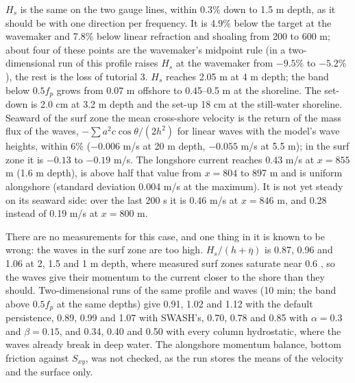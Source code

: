 $H_s$ is the same on the two gauge lines, within 0.3\% down to 1.5 m
depth, as it should be with one direction per frequency. It is 4.9\%
below the target at the wavemaker and 7.8\% below linear refraction and
shoaling from 200 to 600 m; about four of these points are the
wavemaker's midpoint rule (in a two-dimensional run of this profile
 raises $H_s$ at the wavemaker from $-9.5\%$ to
$-5.2\%$), the rest is the loss of tutorial 3. $H_s$ reaches 2.05 m at
4 m depth; the band below $0.5 f_p$ grows from 0.07 m offshore to
0.45--0.5 m at the shoreline. The set-down is 2.0 cm at 3.2 m depth and
the set-up 18 cm at the still-water shoreline. Seaward of the surf zone
the mean cross-shore velocity is the return of the mass flux of the waves,
$-\sum a^2 c\cos\theta/(2h^2)$ for linear waves with the model's wave
heights, within 6\% ($-0.006$ m/s at 20 m depth, $-0.055$ m/s at 5.5 m);
in the surf zone it is $-0.13$ to $-0.19$ m/s. The longshore current
reaches 0.43 m/s at $x = 855$ m (1.6 m depth), is above half that value
from $x = 804$ to 897 m and is uniform alongshore (standard deviation
0.004 m/s at the maximum). It is not yet steady on its seaward side: over
the last 200 s it is 0.46 m/s at $x = 846$ m, and 0.28 instead of
0.19 m/s at $x = 800$ m.

There are no measurements for this case, and one thing in it is known to
be wrong: the waves in the surf zone are too high. $H_s/(h+\bar\eta)$ is
0.87, 0.96 and 1.06 at 2, 1.5 and 1 m depth, where measured surf zones
saturate near 0.6 \citep[$H_{\mathrm{rms}}/h = 0.42$;][]{thornton1982}, so
the waves give their momentum to the current closer to the shore than
they should. Two-dimensional runs of the same profile and waves (10 min;
the band above $0.5 f_p$ at the same depths) give 0.91, 1.02 and 1.12
with the default persistence, 0.89, 0.99 and 1.07 with SWASH's, 0.70,
0.78 and 0.85 with $\alpha = 0.3$ and $\beta = 0.15$, and 0.34, 0.40 and
0.50 with every column hydrostatic, where the waves already break in deep
water. The alongshore momentum balance, bottom friction against $S_{xy}$,
was not checked, as the run stores the means of the velocity and the
surface only.

